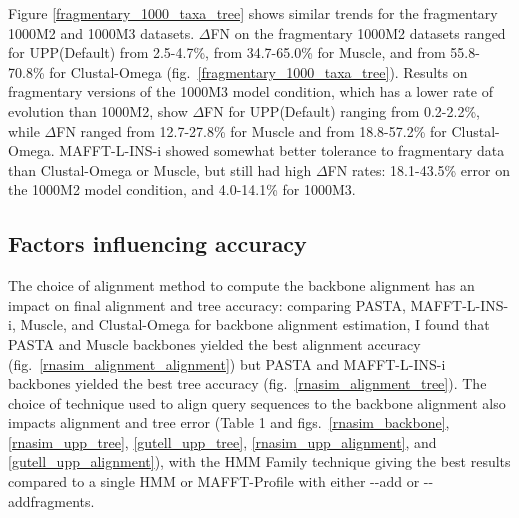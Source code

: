 Figure \ref{fragmentary_1000_taxa_tree} shows
similar trends for the 
fragmentary 1000M2
and 1000M3 datasets.
$\Delta$FN on the fragmentary 1000M2 datasets
ranged for UPP(Default) from 2.5-4.7\%,
from 34.7-65.0\% for Muscle,
and from 55.8-70.8\% for Clustal-Omega (fig.~\ref{fragmentary_1000_taxa_tree}).
Results on fragmentary versions of the 1000M3 model 
condition, which has a lower rate of
evolution than 1000M2, show $\Delta$FN for UPP(Default)
ranging from 0.2-2.2\%,
while $\Delta$FN ranged from 12.7-27.8\% for
Muscle and from 18.8-57.2\% for Clustal-Omega.
MAFFT-L-INS-i showed somewhat
better tolerance to fragmentary
data than Clustal-Omega or Muscle, but still
had high $\Delta$FN rates: 18.1-43.5\% error on the 1000M2 model condition, and 4.0-14.1\% for 1000M3.

\subsection{Factors influencing accuracy}
The choice of alignment method
to compute the backbone alignment has an impact on final alignment and
tree accuracy:
comparing PASTA, MAFFT-L-INS-i, Muscle, and Clustal-Omega
for backbone alignment estimation, I found that
PASTA and Muscle backbones yielded the best alignment accuracy
(fig.~\ref{rnasim_alignment_alignment}) 
but PASTA and MAFFT-L-INS-i backbones yielded the best tree accuracy
(fig.~\ref{rnasim_alignment_tree}).
The choice of technique used to align query sequences
to the backbone alignment also impacts alignment and tree error
(Table 1 and figs.~\ref{rnasim_backbone}, \ref{rnasim_upp_tree}, \ref{gutell_upp_tree},
\ref{rnasim_upp_alignment}, and \ref{gutell_upp_alignment}), with the HMM Family technique giving
the best results compared to a single HMM or MAFFT-Profile with
either -{}-add or -{}-addfragments.

